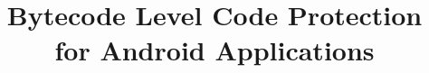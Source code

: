 \documentclass{sig-alternate-05-2015}
\newcommand\FIXME[1]{\textcolor{red}{FIX:}\textcolor{red}{#1}}
\newcommand{\ToolName}{\textsc{DexPro}\xspace}
\begin{document}
\title{Bytecode Level Code Protection for Android Applications}
\author{}

\maketitle

\begin{abstract}



\end{abstract}
\end{document}
